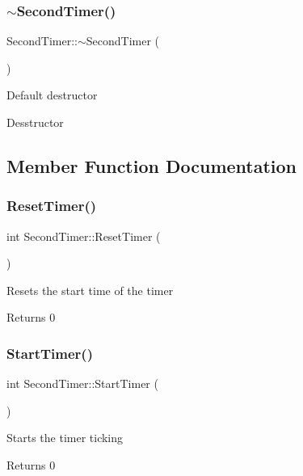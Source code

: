 \subsubsection{\texorpdfstring{$\sim$\+Second\+Timer()}{~SecondTimer()}}
{\footnotesize\ttfamily Second\+Timer\+::$\sim$\+Second\+Timer (\begin{DoxyParamCaption}{ }\end{DoxyParamCaption})}

Default destructor

Desstructor 

\subsection{Member Function Documentation}
\mbox{\label{class_second_timer_aa49709158917df78694a64fbbbf39c24}} 
\subsubsection{\texorpdfstring{Reset\+Timer()}{ResetTimer()}}
{\footnotesize\ttfamily int Second\+Timer\+::\+Reset\+Timer (\begin{DoxyParamCaption}{ }\end{DoxyParamCaption})}

Resets the start time of the timer \begin{DoxyReturn}{Returns}
0 
\end{DoxyReturn}
\mbox{\label{class_second_timer_aaf1b62f5484b58c312756aa892387e63}} 
\subsubsection{\texorpdfstring{Start\+Timer()}{StartTimer()}}
{\footnotesize\ttfamily int Second\+Timer\+::\+Start\+Timer (\begin{DoxyParamCaption}{ }\end{DoxyParamCaption})}

Starts the timer ticking \begin{DoxyReturn}{Returns}
0 
\end{DoxyReturn}
\mbox{\label{class_second_timer_a9a4c3b666de65077a44c4f8048d72107}} 

